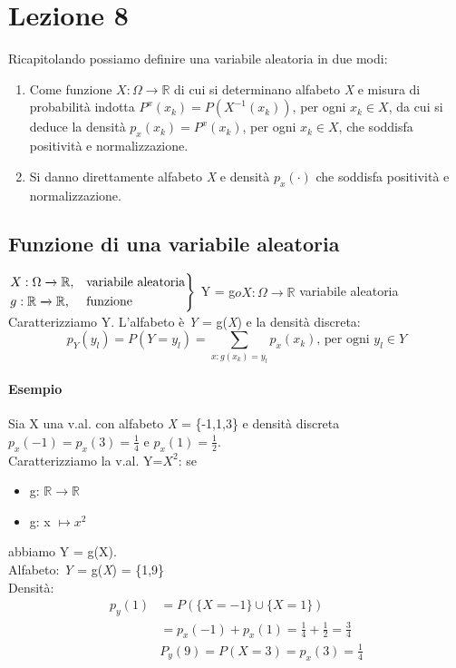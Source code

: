 \documentclass{report}
\begin{document}
\chapter{Lezione 8}
Ricapitolando possiamo definire una variabile aleatoria in due modi: \begin{enumerate}
    \item Come funzione \(X: \Omega \xrightarrow{} \mathbb{R}\) di cui si determinano alfabeto \textit{X} e misura di probabilità indotta \(P^x(x_k) = P(X^{-1}(x_k))\), per ogni \(x_k \in \textit{X}\), da cui si deduce la densità \(p_x(x_k) = P^{x}(x_k)\), per ogni \(x_k \in \textit{X}\), che soddisfa positività e normalizzazione.
    \item Si danno direttamente alfabeto \textit{X} e densità \(p_x(\cdot)\) che soddisfa positività e normalizzazione.
\end{enumerate}
\section{Funzione di una variabile aleatoria}
\(
\begin{rcases}
X:\Omega \xrightarrow{} \mathbb{R}, & \text{variabile aleatoria}\\
g:\mathbb{R} \xrightarrow{} \mathbb{R}, & \text{funzione}
\end{rcases}
\) Y = g\(oX:\Omega \xrightarrow{} \mathbb{R}\)
 variabile aleatoria\\
Caratterizziamo Y. L'alfabeto è \textit{Y} = g(\textit{X}) e la densità discreta:
\[p_Y(y_l) = P(Y=y_l) = \sum_{x:g(x_k) = y_l} p_x(x_k) \text{, per ogni }y_l \in \textit{Y}\]
\subsubsection{Esempio}
Sia X una v.al. con alfabeto \textit{X} = \{-1,1,3\} e densità discreta \(p_x(-1) = p_x(3) = \frac{1}{4}\) e \(p_x(1) = \frac{1}{2}\).\\
Caratterizziamo la v.al. Y=\(X^2\): se \begin{itemize}
    \item g: \(\mathbb{R} \xrightarrow{} \mathbb{R}\)
    \item g: x \(\longmapsto x^2\)
\end{itemize}
abbiamo Y = g(X).\\
Alfabeto: \textit{Y} = g(\textit{X}) = \{1,9\}\\
Densità: \begin{align}
    p_y(1) & = P(\{X = -1\} \cup \{X = 1\})\\
    & = p_x(-1) + p_x(1) = \frac{1}{4}+\frac{1}{2} = \frac{3}{4}\\
   & P_y(9) = P(X=3) = p_x(3) = \frac{1}{4}
\end{align}
\end{document}
